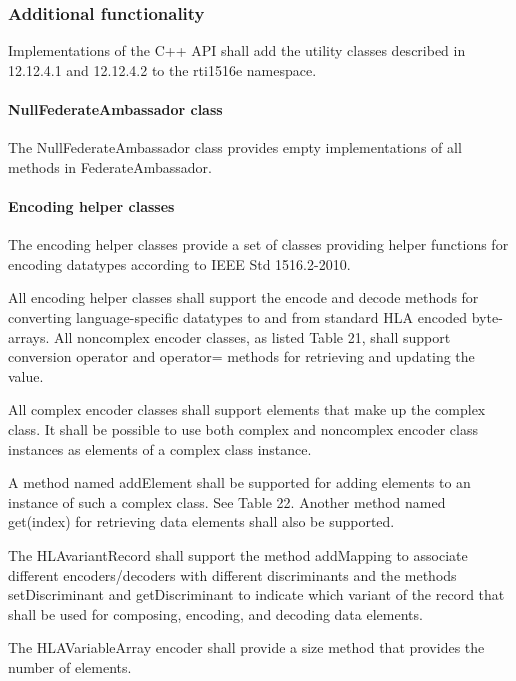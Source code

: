 \begin{compactstdpage}

    \subsubsection{Additional functionality}

    Implementations of the C++ API shall add the utility classes described in 12.12.4.1 and 12.12.4.2 to the rti1516e namespace.

    \paragraph{NullFederateAmbassador class}

    The NullFederateAmbassador class provides empty implementations of all methods in FederateAmbassador.

    \paragraph{Encoding helper classes}

    The encoding helper classes provide a set of classes providing helper functions for encoding datatypes according to IEEE Std 1516.2-2010.

    All encoding helper classes shall support the encode and decode methods for converting language-specific datatypes to and from standard HLA encoded byte-arrays. All noncomplex encoder classes, as listed Table 21, shall support conversion operator and operator= methods for retrieving and updating the value.


\end{compactstdpage}

\clearpage

\begin{compactstdpage}
    \cxiitabletwentyone

    All complex encoder classes shall support elements that make up the complex class. It shall be possible to use both complex and noncomplex encoder class instances as elements of a complex class instance.

    A method named addElement shall be supported for adding elements to an instance of such a complex class. See Table 22. Another method named get(index) for retrieving data elements shall also be supported.

    The HLAvariantRecord shall support the method addMapping to associate different encoders/decoders with different discriminants and the methods setDiscriminant and getDiscriminant to indicate which variant of the record that shall be used for composing, encoding, and decoding data elements.

    The HLAVariableArray encoder shall provide a size method that provides the number of elements.

\end{compactstdpage}

